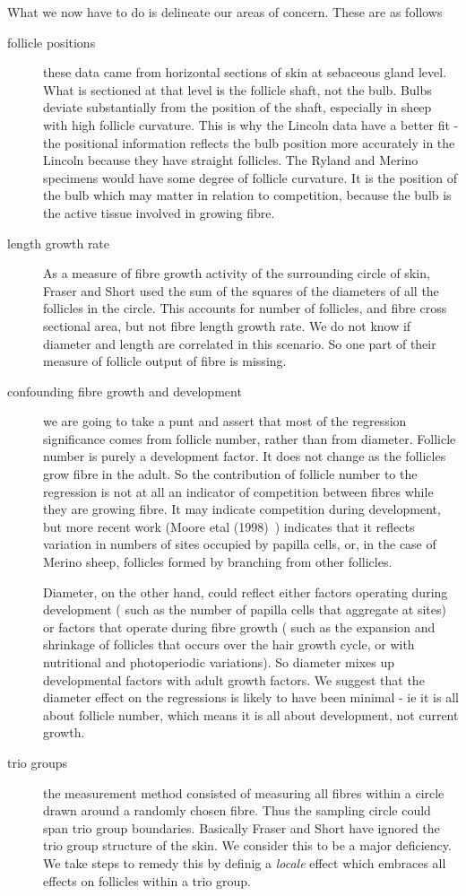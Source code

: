 \documentclass[titlepage]{article}  %
\begin{document}
What we now have to do is delineate our areas of concern. These are as follows
\begin{description}
\item[follicle positions] these data came from horizontal sections of skin at sebaceous gland level. What is sectioned at that level is the follicle shaft, not the bulb.  Bulbs deviate substantially from the position of the shaft, especially in sheep with high follicle curvature. This is why the Lincoln data have a better fit - the positional information reflects the bulb position more accurately in the Lincoln because they have straight follicles. The Ryland and Merino specimens would have some degree of follicle curvature. 
It is the position of the bulb which may matter in relation to competition, because the bulb is the active tissue involved in growing fibre. 
\item[length growth rate] As a measure of fibre growth activity of the surrounding circle of skin, Fraser and Short used the sum of the squares of the diameters of all the follicles in the circle. This accounts for number of follicles, and fibre cross sectional area, but not fibre length growth rate.  We do not know if diameter and length are correlated in this scenario. So one part of their measure of follicle output of fibre is missing.
\item[confounding fibre growth and development] we are going to take a punt and assert that most of the regression significance comes from follicle number, rather than from diameter. Follicle number is purely a development factor. It does not change as the follicles grow fibre in the adult. So the contribution of follicle number to the regression is not at all an indicator of competition between fibres while they are growing fibre. It may indicate competition during development, but more recent work (Moore etal (1998)~\cite{moor:98}) indicates that it reflects variation in numbers of sites occupied by papilla cells, or, in the case of Merino sheep, follicles formed by branching from other follicles. 

Diameter, on the other hand, could reflect either factors operating during development ( such as the number of papilla cells that aggregate at sites) or factors that operate during fibre growth ( such as the expansion and shrinkage of follicles that occurs over the hair growth cycle, or with nutritional and photoperiodic variations). So diameter mixes up developmental factors with adult growth factors.  We suggest that the diameter effect on the regressions is likely to have been minimal - ie it is all about follicle number, which means it is all about development, not current growth.
\item[trio groups] the measurement method consisted of measuring all fibres within a circle drawn around a randomly chosen fibre. Thus the sampling circle could span trio group boundaries.  Basically Fraser and Short have ignored the trio group structure of the skin. We consider this to be a major deficiency. We take steps to remedy this by definig a {\em locale} effect which embraces all effects on follicles within a trio group.
\end{description}
\end{document}
